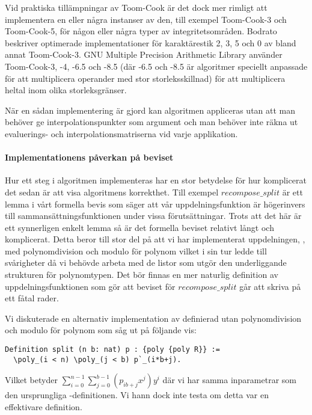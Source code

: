 Vid praktiska tillämpningar av Toom-Cook är det dock mer rimligt att implementera
en eller några instanser av den, till exempel Toom-Cook-3 och Toom-Cook-5, för
någon eller några typer av
integritetsområden.
Bodrato\cite{bodrato2007notes}\cite{bodrato2007towards}\cite{bodrato2007integer}
beskriver optimerade implementationer för karaktärestik 2, 3, 5 och 0 av bland
annat Toom-Cook-3. GNU Multiple Precision Arithmetic Library använder
Toom-Cook-3, -4, -6.5 och -8.5 (där -6.5 och -8.5 är algoritmer speciellt anpassade
för att multiplicera operander med stor storleksskillnad) för att multiplicera
heltal inom olika storleksgränser\cite{gmpdoc}.

När en sådan implementering är gjord kan algoritmen appliceras utan att man
behöver ge interpolationspunkter som argument och man behöver inte räkna ut evaluerings- och
interpolationsmatriserna vid varje applikation.

\paragraph{Implementationens påverkan på beviset}
Hur ett steg i algoritmen implementeras har en stor betydelse
för hur komplicerat det sedan är att visa algoritmens korrekthet. Till exempel
$recompose\_split$ är ett lemma i vårt formella bevis som säger att vår
uppdelningsfunktion  är högerinvers till sammansättningsfunktionen  under vissa förutsättningar.
Trots att det här är ett synnerligen enkelt lemma så är det
formella beviset relativt långt och komplicerat. Detta beror till stor del på
att vi har implementerat uppdelningen, , med polynomdivision och
modulo för polynom vilket i sin tur ledde till svårigheter då vi behövde arbeta
med de listor som utgör den underliggande strukturen för polynomtypen. Det bör
finnas en mer naturlig definition av uppdelningsfunktionen som gör att beviset
för $recompose\_split$ går att skriva på ett fåtal rader.

Vi diskuterade en alternativ implementation av  definierad utan
polynomdivision och modulo för polynom som såg ut på följande vis:
\begin{lstlisting}
Definition split (n b: nat) p : {poly {poly R}} :=
  \poly_(i < n) \poly_(j < b) p`_(i*b+j).
\end{lstlisting}
Vilket betyder $\sum_{i=0}^{n-1}\sum_{j=0}^{b-1}(p_{ib+j}x^j)y^i$ där vi har samma inparametrar
som den ursprungliga -definitionen. Vi hann dock inte testa om detta var en effektivare definition.



